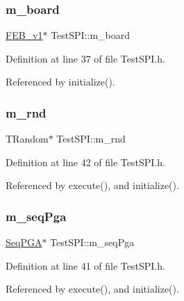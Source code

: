 \subsubsection{\texorpdfstring{m\+\_\+board}{m\_board}}
{\footnotesize\ttfamily \hyperlink{classFEB__v1}{F\+E\+B\+\_\+v1}$\ast$ Test\+S\+P\+I\+::m\+\_\+board\hspace{0.3cm}{\ttfamily [private]}}



Definition at line 37 of file Test\+S\+P\+I.\+h.



Referenced by initialize().

\mbox{\label{classTestSPI_a6dd3f4705c0fc8f36a3e71e67517e1cc}} 
\subsubsection{\texorpdfstring{m\+\_\+rnd}{m\_rnd}}
{\footnotesize\ttfamily T\+Random$\ast$ Test\+S\+P\+I\+::m\+\_\+rnd\hspace{0.3cm}{\ttfamily [private]}}



Definition at line 42 of file Test\+S\+P\+I.\+h.



Referenced by execute(), and initialize().

\mbox{\label{classTestSPI_aab9cccf2a1594a2539b11d6c637389b0}} 
\subsubsection{\texorpdfstring{m\+\_\+seq\+Pga}{m\_seqPga}}
{\footnotesize\ttfamily \hyperlink{classSeqPGA}{Seq\+P\+GA}$\ast$ Test\+S\+P\+I\+::m\+\_\+seq\+Pga\hspace{0.3cm}{\ttfamily [private]}}



Definition at line 41 of file Test\+S\+P\+I.\+h.



Referenced by execute(), and initialize().

\mbox{\label{classTestSPI_a4bc59347208b4a5ae97188bdcfc31da2}} 
